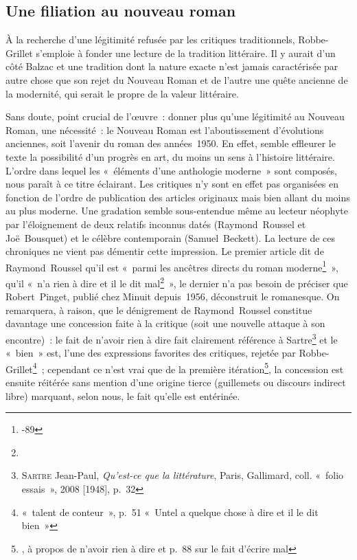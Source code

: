 \documentclass[12pt, a4paper]{article}
\begin{document}
\subsection{Une filiation au nouveau roman}
\label{filiation}
À la recherche d'une légitimité refusée par les critiques traditionnels, Robbe-Grillet s'emploie à fonder une lecture de la tradition littéraire. Il y aurait d'un côté Balzac et une tradition dont la nature exacte n'est jamais caractérisée par autre chose que son rejet du Nouveau Roman et de l'autre une quête ancienne de la modernité, qui serait le propre de la valeur littéraire.




Sans doute, point crucial de l'œuvre~: donner plus qu'une légitimité au Nouveau Roman, une nécessité~: le Nouveau Roman est l'aboutissement d'évolutions anciennes, soit l'avenir du roman des années~1950. En effet, semble effleurer le texte la possibilité d'un progrès en art, du moins un sens à l'histoire littéraire.
L'ordre dans lequel les «~éléments d'une anthologie moderne~» sont composés, nous paraît à ce titre éclairant. Les critiques n'y sont en effet pas organisées en fonction de l'ordre de publication des articles originaux mais bien allant du moins au plus moderne. Une gradation semble sous-entendue même au lecteur néophyte par l'éloignement de deux relatifs inconnus datés (Raymond~Roussel et Joë~Bousquet) et le célèbre contemporain (Samuel~Beckett). La lecture de ces chroniques ne vient pas démentir cette impression. Le premier article dit de Raymond~Roussel qu'il est «~parmi les ancêtres directs du roman moderne\footnote{-89}~», qu'il «~n’a rien à dire et il le dit mal\footnote{}~», le dernier n'a pas besoin de préciser que Robert~Pinget, publié chez Minuit depuis~1956, déconstruit le romanesque. On remarquera, à raison, que le dénigrement de Raymond~Roussel constitue davantage une concession faite à la critique (soit une nouvelle attaque à son encontre)~: le fait de n'avoir rien à dire fait clairement référence à Sartre\footnote{\textsc{Sartre} Jean-Paul, \textit{Qu'est-ce que la littérature}, Paris, Gallimard, coll. «~folio essais~», 2008 [1948], p.~32} et le «~bien~» est, l'une des expressions favorites des critiques, rejetée par Robbe-Grillet\footnote{ «~talent de conteur~», p.~51 «~Untel a quelque chose à dire et il le dit bien~»}~; cependant ce n'est vrai que de la première itération\footnote{, à propos de n'avoir rien à dire et p.~88 sur le fait d'écrire mal}, la concession est ensuite réitérée sans mention d'une origine tierce (guillemets ou discours indirect libre) marquant, selon nous, le fait qu'elle est entérinée.
\end{document}
